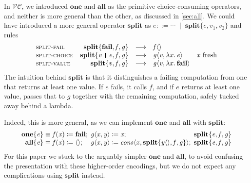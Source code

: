 \documentclass[acmsmall,review,dvipsnames]{acmart}
\newcommand{\Varid}[1]{\mathit{#1}}
\newcommand{\versecalc}{$\mathcal{VC}$}
\newcommand{\rulename}[1]{\textsc{\small #1}}
\newcommand{\vb}{\; \ensuremath{\mathop{\mid}} \;}    %
\newcommand{\movesto}{\longrightarrow}
\begin{document}
In \versecalc{}, we introduced \ensuremath{\textbf{one}} and \ensuremath{\textbf{all}} as the primitive choice-consuming operators, and neither is more general than the other, as discussed in \cref{sec:all}. We could have introduced a more general operator \ensuremath{\textbf{split}} as $e ::=  \ensuremath{\cdots} \vb \ensuremath{\textbf{split}\{\Varid{e},\Varid{v}_{\mathrm{1}},\Varid{v}_{\mathrm{2}}\}}$ and rules
\[\begin{array}{lrcll}
    \rulename{split-fail} & \ensuremath{\textbf{split}\{\textbf{fail},\Varid{f},\Varid{g}\}} & \movesto & \ensuremath{\Varid{f}\langle\rangle} \\
    \rulename{split-choice} & \ensuremath{\textbf{split}\{\Varid{v}\hspace{1mm}\mathop{\rule[-0.3mm]{0.5mm}{2.5mm}}\hspace{1mm}\Varid{e},\Varid{f},\Varid{g}\}} & \movesto & \ensuremath{\Varid{g}\langle\Varid{v},\lambda x.\,\Varid{e}\rangle} & \text{\ensuremath{\Varid{x}} fresh}  \\
    \rulename{split-value} & \ensuremath{\textbf{split}\{\Varid{v},\Varid{f},\Varid{g}\}} & \movesto & \ensuremath{\Varid{g}\langle\Varid{v},\lambda x.\,\textbf{fail}\rangle} \\
\end{array}\]
The intuition behind \ensuremath{\textbf{split}} is that it distinguishes a failing computation from one that returns at least one value. If \ensuremath{\Varid{e}} fails, it calls \ensuremath{\Varid{f}}, and if \ensuremath{\Varid{e}} returns at least one value, passes that to \ensuremath{\Varid{g}} together with the remaining computation, safely tucked away behind a lambda.

Indeed, this is more general, as we can implement \ensuremath{\textbf{one}} and \ensuremath{\textbf{all}} with \ensuremath{\textbf{split}}:
\[\begin{array}{r@{\;}l@{\;}l@{\;}l}
    \ensuremath{\textbf{one}\{\Varid{e}\}} & \equiv \ensuremath{\Varid{f}(\Varid{x})\mathrel{\coloneqq}\textbf{fail};\,} & \ensuremath{\Varid{g}\langle\Varid{x},\Varid{y}\rangle\mathrel{\coloneqq}\Varid{x};\,} & \ensuremath{\textbf{split}\{\Varid{e},\Varid{f},\Varid{g}\}} \\
    \ensuremath{\textbf{all}\{\Varid{e}\}} & \equiv \ensuremath{\Varid{f}(\Varid{x})\mathrel{\coloneqq}\langle\rangle;\,}    & \ensuremath{\Varid{g}\langle\Varid{x},\Varid{y}\rangle\mathrel{\coloneqq}\Varid{cons}\langle\Varid{x},\textbf{split}\{\Varid{y}\langle\rangle,\Varid{f},\Varid{g}\}\rangle;\,} & \ensuremath{\textbf{split}\{\Varid{e},\Varid{f},\Varid{g}\}}
\end{array}\]
For this paper we stuck to the arguably simpler \ensuremath{\textbf{one}} and \ensuremath{\textbf{all}},
to avoid confusing the presentation with these higher-order encodings, but we do not expect any complications using \ensuremath{\textbf{split}} instead.
\end{document}
